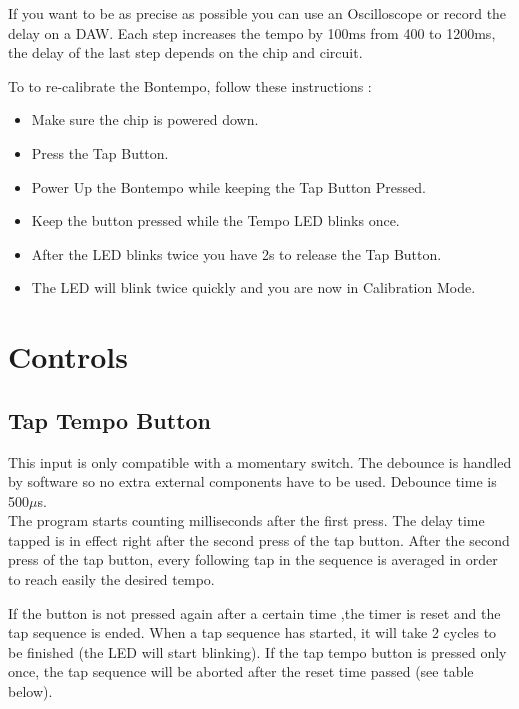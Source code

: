 \documentclass[a4paper, 10pt]{article}
\begin{document}
If you want to be as precise as possible you can use an Oscilloscope or record the delay on a DAW. Each step increases the tempo by 100ms from 400 to 1200ms, the delay of the last step depends on the chip and circuit. 

To to re-calibrate the Bontempo, follow these instructions :\\
\begin{itemize}
\item Make sure the chip is powered down.
\item Press the Tap Button.
\item Power Up the Bontempo while keeping the Tap Button Pressed.
\item Keep the button pressed while the Tempo LED blinks once.
\item After the LED blinks twice you have 2s to release the Tap Button.
\item The LED will blink twice quickly and you are now in Calibration Mode.\\
\end{itemize}

\newpage
\section{Controls}
\subsection{Tap Tempo Button}
\bigbreak
This input is only compatible with a momentary switch.
The debounce is handled by software so no extra external components have to be used. Debounce time is 500$\mu$s.\\

The program starts counting milliseconds after the first press. The delay time tapped is in effect right after the second press of the tap button. After the second press of the tap button, every following tap in the sequence is averaged in order to reach easily the desired tempo. 

If the button is not pressed again after a certain time ,the timer is reset and the tap sequence is ended. When a tap sequence has started, it will take 2 cycles to be finished (the LED will start blinking). If the tap tempo button is pressed only once, the tap sequence will be aborted after the reset time passed (see table below).\\
\end{document}
